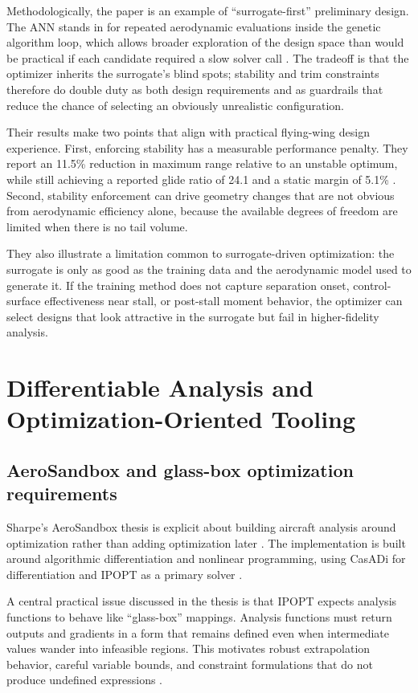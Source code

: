 Methodologically, the paper is an example of ``surrogate-first'' preliminary design. The ANN stands in for repeated aerodynamic evaluations inside the genetic algorithm loop, which allows broader exploration of the design space than would be practical if each candidate required a slow solver call \cite{Zhang2025ANNGA}. The tradeoff is that the optimizer inherits the surrogate's blind spots; stability and trim constraints therefore do double duty as both design requirements and as guardrails that reduce the chance of selecting an obviously unrealistic configuration.

Their results make two points that align with practical flying-wing design experience. First, enforcing stability has a measurable performance penalty. They report an 11.5\% reduction in maximum range relative to an unstable optimum, while still achieving a reported glide ratio of 24.1 and a static margin of 5.1\% \cite{Zhang2025ANNGA}. Second, stability enforcement can drive geometry changes that are not obvious from aerodynamic efficiency alone, because the available degrees of freedom are limited when there is no tail volume.

They also illustrate a limitation common to surrogate-driven optimization: the surrogate is only as good as the training data and the aerodynamic model used to generate it. If the training method does not capture separation onset, control-surface effectiveness near stall, or post-stall moment behavior, the optimizer can select designs that look attractive in the surrogate but fail in higher-fidelity analysis.

\chapter{Differentiable Analysis and Optimization-Oriented Tooling}
\section{AeroSandbox and glass-box optimization requirements}
Sharpe's AeroSandbox thesis is explicit about building aircraft analysis around optimization rather than adding optimization later \cite{Sharpe2021AeroSandbox}. The implementation is built around algorithmic differentiation and nonlinear programming, using CasADi for differentiation and IPOPT as a primary solver \cite{Sharpe2021AeroSandbox}.

A central practical issue discussed in the thesis is that IPOPT expects analysis functions to behave like ``glass-box'' mappings. Analysis functions must return outputs and gradients in a form that remains defined even when intermediate values wander into infeasible regions. This motivates robust extrapolation behavior, careful variable bounds, and constraint formulations that do not produce undefined expressions \cite{Sharpe2021AeroSandbox}.

